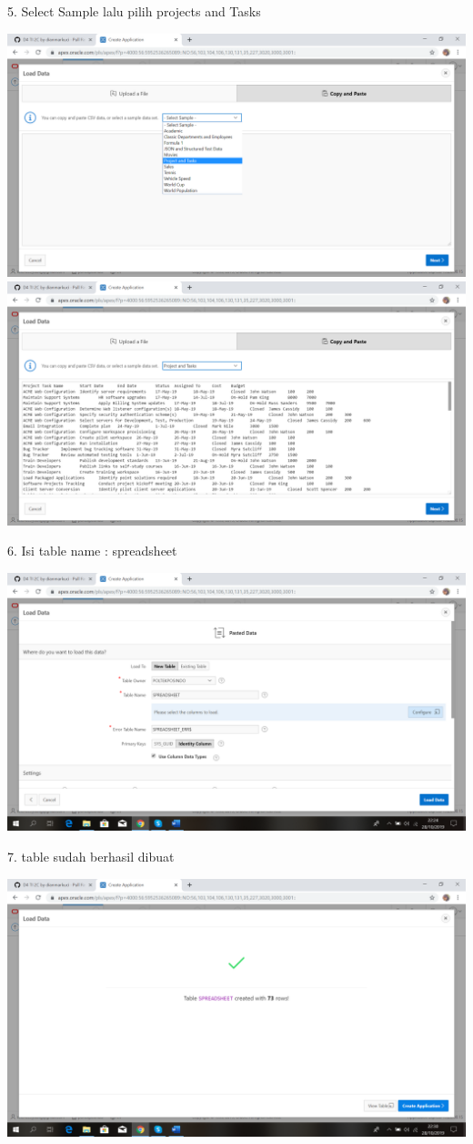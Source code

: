 \documentclass{article}
\begin{document}
    \item 5. Select Sample lalu pilih projects and Tasks
\begin{center}
    \includegraphics[width=10cm\textwidth]{figure/6.png}
    \includegraphics[width=10cm\textwidth]{figure/7.png}
\end{center}
    
    \item 6. Isi table name : spreadsheet
\begin{center}
    \includegraphics[width=10cm\textwidth]{figure/8.png}
\end{center}

\item 7. table sudah berhasil dibuat
\begin{center}
  \includegraphics[width=10cm\textwidth]{figure/9.png}
\end{center}
   
\end{document}
